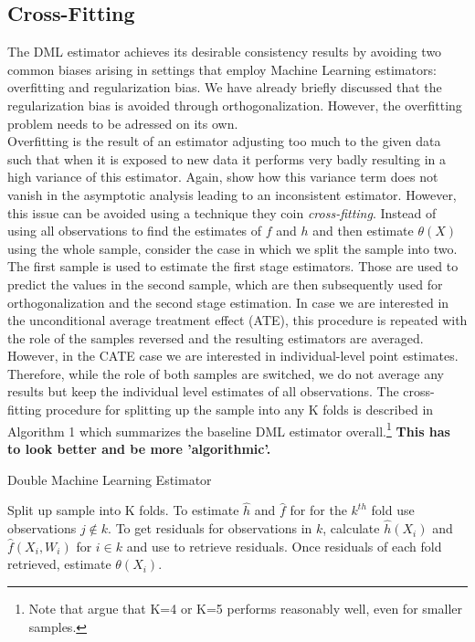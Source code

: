 \subsection{Cross-Fitting} \label{sec:cross-fitting}
The DML estimator achieves its desirable consistency results by avoiding two common biases arising in settings that employ Machine Learning estimators: overfitting and regularization bias. We have already briefly discussed that the regularization bias is avoided through orthogonalization. However, the overfitting problem needs to be adressed on its own. \\
Overfitting is the result of an estimator adjusting too much to the given data such that when it is exposed to new data it performs very badly resulting in a high variance of this estimator. Again, \cite{DML2017} show how this variance term does not vanish in the asymptotic analysis leading to an inconsistent estimator. However, this issue can be avoided using a technique they coin \textit{cross-fitting}. Instead of using all observations to find the estimates of $f$ and $h$ and then estimate $\theta(X)$ using the whole sample, consider the case in which we split the sample into two. The first sample is used to estimate the first stage estimators. Those are used to predict the values in the second sample, which are then subsequently used for orthogonalization and the second stage estimation. In case we are interested in the unconditional average treatment effect (ATE), this procedure is repeated with the role of the samples reversed and the resulting estimators are averaged. However, in the CATE case we are interested in individual-level point estimates. Therefore, while the role of both samples are switched, we do not average any results but keep the individual level estimates of all observations. The cross-fitting procedure for splitting up the sample into any K folds is described in Algorithm 1 which summarizes the baseline DML estimator overall.\footnote{Note that \cite{DML2017} argue that K=4 or K=5 performs reasonably well, even for smaller samples.} 
\newpage
\textbf{This has to look better and be more 'algorithmic'.}
\begin{algorithm}
    \caption{Double Machine Learning Estimator}
    \begin{algorithmic}[1]
        \State Split up sample into K folds. 
        \State To estimate $\widehat{h}$ and $\widehat{f}$ for for the $k^{th}$ fold use observations $j \notin k$. 
        \State To get residuals for observations in $k$, calculate $\widehat{h}(X_i)$ and $\widehat{f}(X_i, W_i)$ for $i \in k$ and use to retrieve residuals.
        \State Once residuals of each fold retrieved, estimate $\theta(X_i)$.
    \end{algorithmic}
\end{algorithm}

